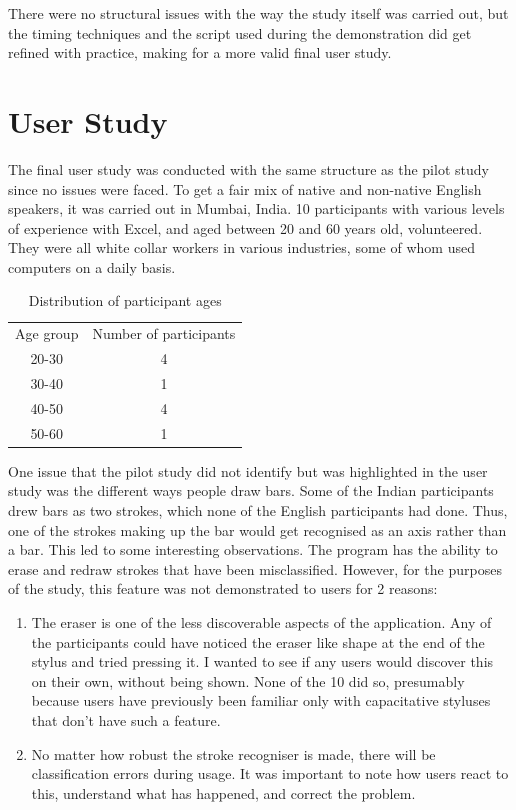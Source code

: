 There were no structural issues with the way the study itself was carried out, but the timing techniques and the script used during the demonstration did get refined with practice, making for a more valid final user study.

\section{User Study}
The final user study was conducted with the same structure as the pilot study since no issues were faced. To get a fair mix of native and non-native English speakers, it was carried out in Mumbai, India. 10 participants with various levels of experience with Excel, and aged between 20 and 60 years old, volunteered. They were all white collar workers in various industries, some of whom used computers on a daily basis.

\begin{table}
\begin{center}
\begin{tabular}{c c}
Age group & Number of participants \\
20-30 & 4 \\
30-40 & 1 \\
40-50 & 4 \\
50-60 & 1 \\

\end{tabular}
\end{center}
\caption{Distribution of participant ages}
\end{table}

One issue that the pilot study did not identify but was highlighted in the user study was the different ways people draw bars. Some of the Indian participants drew bars as two strokes, which none of the English participants had done. Thus, one of the strokes making up the bar would get recognised as an axis rather than a bar. This led to some interesting observations. The program has the ability to erase and redraw strokes that have been misclassified. However, for the purposes of the study, this feature was not demonstrated to users for 2 reasons:
\begin{enumerate}
\item The eraser is one of the less discoverable aspects of the application. Any of the participants could have noticed the eraser like shape at the end of the stylus and tried pressing it. I wanted to see if any users would discover this on their own, without being shown. None of the 10 did so, presumably because users have previously been familiar only with capacitative styluses that don't have such a feature. 
\item No matter how robust the stroke recogniser is made, there will be classification errors during usage. It was important to note how users react to this, understand what has happened, and correct the problem.
\end{enumerate} 

